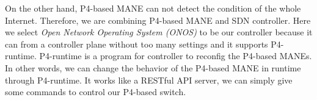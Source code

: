 On the other hand, P4-based MANE can not detect the condition of the whole Internet. Therefore, we are combining P4-based MANE and SDN controller. Here we select {\em Open Network Operating System (ONOS)} to be our controller because it can from a controller plane without too many settings and it supports P4-runtime. P4-runtime is a program for controller to reconfig the P4-based MANEs. In other words, we can change the behavior of the P4-based MANE in runtime through P4-runtime. It works like a RESTful API server, we can simply give some commands to control our P4-based switch. 